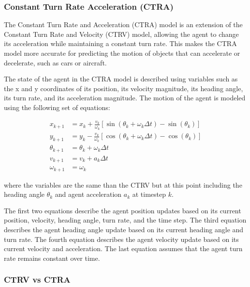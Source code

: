 \subsubsection{Constant Turn Rate Acceleration (CTRA)}
\label{subsubsec:3_CTRA}

The Constant Turn Rate and Acceleration (CTRA) model is an extension of the Constant Turn Rate and Velocity (CTRV) model, allowing the agent to change its acceleration while maintaining a constant turn rate. This makes the CTRA model more accurate for predicting the motion of objects that can accelerate or decelerate, such as cars or aircraft.

The state of the agent in the CTRA model is described using variables such as the x and y coordinates of its position, its velocity magnitude, its heading angle, its turn rate, and its acceleration magnitude. The motion of the agent is modeled using the following set of equations:

\begin{equation}
\begin{split}
		x_{k+1} &= x_k + \frac{v_k}{\omega_k} \left[ \sin(\theta_k + \omega_k \Delta t) - \sin(\theta_k) \right] \\
		y_{k+1} &= y_k - \frac{v_k}{\omega_k} \left[ \cos(\theta_k + \omega_k \Delta t) - \cos(\theta_k) \right] \\
		\theta_{k+1} &= \theta_k + \omega_k \Delta t \\
		v_{k+1} &= v_k + a_k \Delta t \\
		\omega_{k+1} &= \omega_k
\end{split}
\end{equation}

where the variables are the same than the \ac{CTRV} but at this point including the heading angle $\theta_k$ and agent acceleration $a_k$ at timestep $k$.

The first two equations describe the agent position updates based on its current position, velocity, heading angle, turn rate, and the time step. The third equation describes the agent heading angle update based on its current heading angle and turn rate. The fourth equation describes the agent velocity update based on its current velocity and acceleration. The last equation assumes that the agent turn rate remains constant over time.

\subsubsection{CTRV vs CTRA}
\label{subsubsec:3_CTRV_vs_CTRA}


